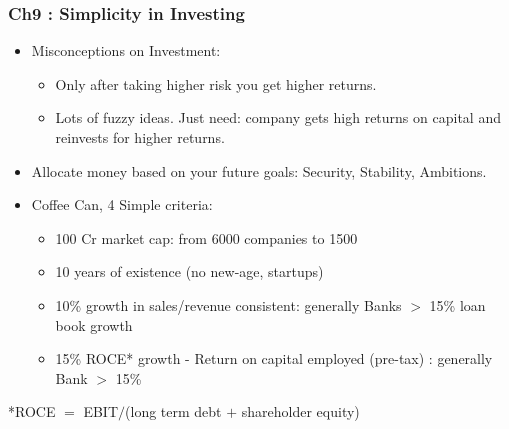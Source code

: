 \begin{frame}[fragile]\frametitle{Ch9 : Simplicity in  Investing}

\begin{itemize}
\item Misconceptions on Investment:
	\begin{itemize}
	\item Only after taking higher risk you get higher returns.
	\item Lots of fuzzy ideas. Just need:  company gets high returns on capital and reinvests for higher returns.
	\end{itemize}
\item Allocate money based on your future goals: Security, Stability, Ambitions.
\item Coffee Can, 4 Simple criteria:
	\begin{itemize}
	\item 100 Cr market cap: from 6000 companies to 1500
	\item 10 years of existence (no new-age, startups)
	\item  10\% growth in sales/revenue consistent: generally  Banks $>$ 15\% loan book growth
	\item 15\% ROCE* growth  - Return on capital employed (pre-tax) : generally Bank $>$ 15\%
	\end{itemize} 
\end{itemize}

*ROCE $=$ EBIT$/$(long term debt $+$ shareholder equity)

\end{frame}